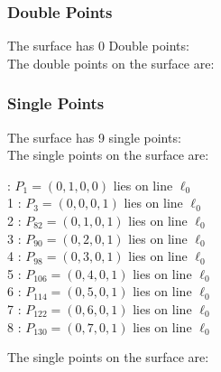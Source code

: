 \documentclass{article}
\begin{document}
{\subsubsection*{Double Points}
The surface has 0 Double points:\\
The double points on the surface are:\\
\begin{multicols}{2}
\noindent
\end{multicols}
\subsubsection*{Single Points}
The surface has 9 single points:\\
The single points on the surface are:\\
\begin{multicols}{2}
 : $P_{1}=( 0, 1, 0, 0 )$ lies on line $\ell_{0}$\\
1 : $P_{3}=( 0, 0, 0, 1 )$ lies on line $\ell_{0}$\\
2 : $P_{82}=( 0, 1, 0, 1 )$ lies on line $\ell_{0}$\\
3 : $P_{90}=( 0, 2, 0, 1 )$ lies on line $\ell_{0}$\\
4 : $P_{98}=( 0, 3, 0, 1 )$ lies on line $\ell_{0}$\\
5 : $P_{106}=( 0, 4, 0, 1 )$ lies on line $\ell_{0}$\\
6 : $P_{114}=( 0, 5, 0, 1 )$ lies on line $\ell_{0}$\\
7 : $P_{122}=( 0, 6, 0, 1 )$ lies on line $\ell_{0}$\\
8 : $P_{130}=( 0, 7, 0, 1 )$ lies on line $\ell_{0}$\\
\end{multicols}
The single points on the surface are:\\
}
\end{document}
